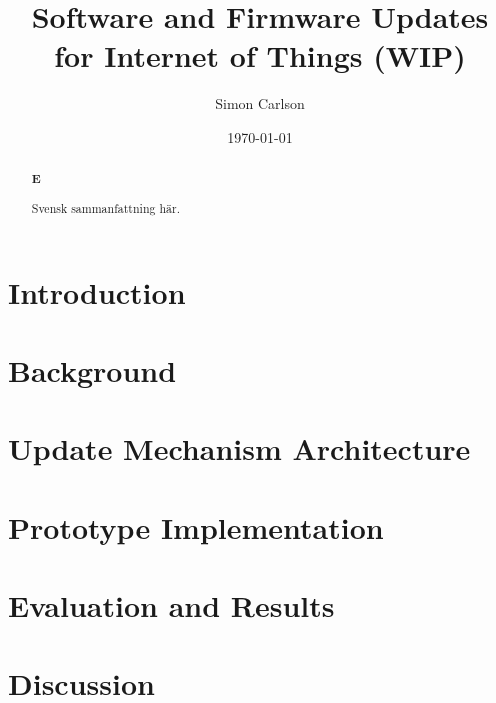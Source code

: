 \documentclass{kththesis}
\title{Software and Firmware Updates for Internet of Things (WIP)}
\author{Simon Carlson}
\date{\today}
\begin{document}
\frontmatter

\titlepage

\begin{abstract}
\textbf{E}
\end{abstract}


\begin{otherlanguage}{swedish}
    \begin{abstract}
        Svensk sammanfattning här.
    \end{abstract}
\end{otherlanguage}


\tableofcontents
\listoftables
\listoffigures
\lstlistoflistings
\printglossaries

\mainmatter


\chapter{Introduction}


\chapter{Background}


\chapter{Update Mechanism Architecture}


\chapter{Prototype Implementation}


\chapter{Evaluation and Results}


\chapter{Discussion}


\printbibliography[heading=bibintoc] %


\end{document}
